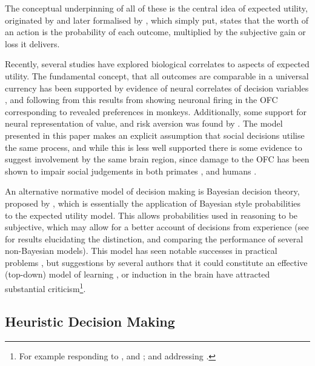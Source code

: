 The conceptual underpinning of all of these is the central idea of expected utility, originated by \citet{Bernoulli1954} and later formalised by \citet{Neumann1953}, which simply put, states that the worth of an action is the probability of each outcome, multiplied by the subjective gain or loss it delivers.

Recently, several studies have explored biological correlates to aspects of expected utility. The fundamental concept, that all outcomes are comparable in a universal currency has been supported by evidence of neural correlates of decision variables \citep{Platt1999}, and following from this results from \citet{Padoa-Schioppa2006,Padoa-Schioppa2008} showing neuronal firing in the \ac{OFC} corresponding to revealed preferences in monkeys. Additionally, some support for neural representation of value, and risk aversion was found by \citet{Christopoulos2009}. The model presented in this paper makes an explicit assumption that social decisions utilise the same process, and while this is less well supported there is some evidence to suggest involvement by the same brain region, since damage to the \ac{OFC} has been shown to impair social judgements in both primates \citep{Watson2012}, and humans \citep{Willis2010}.

An alternative normative model of decision making is Bayesian decision theory, proposed by \citet{Robbins1964}, which is essentially the application of Bayesian style probabilities to the expected utility model. This allows probabilities used in reasoning to be subjective, which may allow for a better account of decisions from experience (see \citet{Hertwig2004,Hau2008} for results elucidating the distinction, and comparing the performance of several non-Bayesian models). This model has seen notable successes in practical problems \citep{McNamara1980,Kristensen1997,Survey2003}, but suggestions by several authors  that it could constitute an effective (top-down) model of learning \citep{Tenenbaum2006,Griffiths2010}, or induction \citep{Gallistel2012} in the brain have attracted substantial criticism\footnote{For example \citet{Bowers2012} responding to \citet{Tenenbaum2006}, and \citet{Griffiths2010}; and \citet{Miller2012} addressing \citet{Gallistel2012}.}.

\subsection{Heuristic Decision Making}\label{sub:heuristic_theories}

